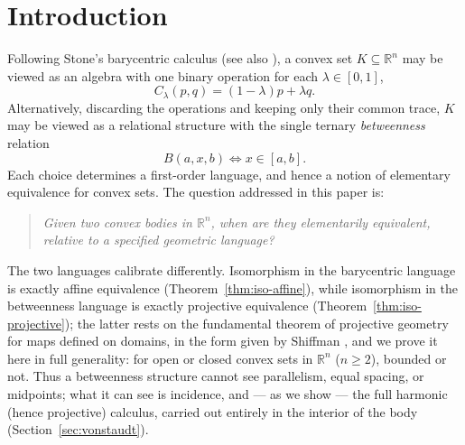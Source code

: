 \documentclass[11pt]{amsart}
\theoremstyle{definition}
\newcommand{\R}{\mathbb{R}}
\begin{document}
\begin{abstract}
minus a boundary point, cone $\cong$ half-cylinder) and separate $\R^n$, the
slab, and the open ball by sentences recovering the Euclidean/hyperbolic
trichotomy through sections. For closed noncompact sets the asymptotic
structure is itself elementary: the dimensions of the recession cone and of
the lineality space, and the existence of one-sided recession directions, are
determined by the betweenness theory, separating in particular the closed
solid cylinder from the closed slab; the open cylinder and the open slab are
separated through the section trichotomy, while a projective identification
shows that recession data are provably not elementary for open sets. On standard compact bodies the affine
half of this picture is thus a theorem; the projective half we leave open,
isolating the two obstacles that separate it from the affine case ---
recovery of boundary coordinates, and the absence of a compact gauge for
projectively homogeneous bodies such as the quadric.
\end{abstract}

\maketitle

\section{Introduction}\label{sec:intro}

Following Stone's barycentric calculus \cite{Stone49} (see also
\cite{Neumann70, RomanowskaSmith02}), a convex set $K\subseteq\R^n$ may be
viewed as an algebra with one binary operation for each $\lambda\in[0,1]$,
\[
C_\lambda(p,q)=(1-\lambda)p+\lambda q .
\]
Alternatively, discarding the operations and keeping only their common trace,
$K$ may be viewed as a relational structure with the single ternary
\emph{betweenness} relation
\[
B(a,x,b)\iff x\in[a,b].
\]
Each choice determines a first-order language, and hence a notion of
elementary equivalence for convex sets. The question addressed in this paper
is:
\begin{quote}
\emph{Given two convex bodies in $\R^n$, when are they elementarily
equivalent, relative to a specified geometric language?}
\end{quote}

The two languages calibrate differently. Isomorphism in the barycentric
language is exactly affine equivalence (Theorem~\ref{thm:iso-affine}), while
isomorphism in the betweenness language is exactly projective equivalence
(Theorem~\ref{thm:iso-projective}); the latter rests on the fundamental
theorem of projective geometry for maps defined on domains, in the form given
by Shiffman \cite{Shiffman95}, and we prove it here in full generality: for
open or closed convex sets in $\R^n$ ($n\ge2$), bounded or not. Thus a
betweenness structure cannot see parallelism, equal spacing, or midpoints;
what it can see is incidence, and --- as we show --- the full harmonic (hence
projective) calculus, carried out entirely in the interior of the body
(Section~\ref{sec:vonstaudt}).
\end{document}

